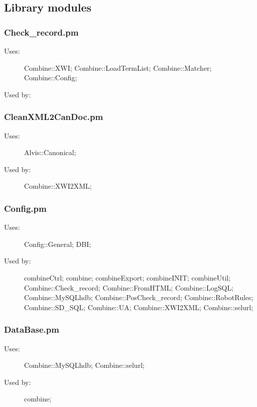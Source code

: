 \subsection{Library modules}
\subsubsection{Check\_record.pm}
\begin{description}
\item[Uses:] Combine::XWI; Combine::LoadTermList; Combine::Matcher; Combine::Config; 

\item[Used by:] 

\end{description}
\subsubsection{CleanXML2CanDoc.pm}
\begin{description}
\item[Uses:] Alvis::Canonical; 

\item[Used by:] Combine::XWI2XML; 

\end{description}
\subsubsection{Config.pm}
\begin{description}
\item[Uses:] Config::General; DBI; 

\item[Used by:] combineCtrl; combine; combineExport; combineINIT; combineUtil; Combine::Check\_record; Combine::FromHTML; Combine::LogSQL; Combine::MySQLhdb; Combine::PosCheck\_record; Combine::RobotRules; Combine::SD\_SQL; Combine::UA; Combine::XWI2XML; Combine::selurl; 

\end{description}
\subsubsection{DataBase.pm}
\begin{description}
\item[Uses:] Combine::MySQLhdb; Combine::selurl; 

\item[Used by:] combine; 

\end{description}
